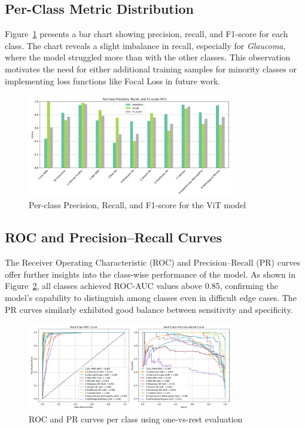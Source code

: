 \documentclass[a4paper,12pt]{report}
\begin{document}
\subsection{Per-Class Metric Distribution}

Figure~\ref{fig:per_class_metrics} presents a bar chart showing precision, recall, and F1-score for each class. The chart reveals a slight imbalance in recall, especially for \textit{Glaucoma}, where the model struggled more than with the other classes. This observation motivates the need for either additional training samples for minority classes or implementing loss functions like Focal Loss in future work.

\begin{figure}[h]
    \centering
    \includegraphics[width=0.8\textwidth]{per_class_viT_full.png}
    \caption{Per-class Precision, Recall, and F1-score for the ViT model}
    \label{fig:per_class_metrics}
\end{figure}

\subsection{ROC and Precision–Recall Curves}

The Receiver Operating Characteristic (ROC) and Precision–Recall (PR) curves offer further insights into the class-wise performance of the model. As shown in Figure~\ref{fig:roc_pr}, all classes achieved ROC-AUC values above 0.85, confirming the model’s capability to distinguish among classes even in difficult edge cases. The PR curves similarly exhibited good balance between sensitivity and specificity.

\begin{figure}[h]
    \centering
    \includegraphics[width=0.8\textwidth]{roc_pr_viT_full.png}
    \caption{ROC and PR curves per class using one-vs-rest evaluation}
    \label{fig:roc_pr}
\end{figure}
\end{document}
